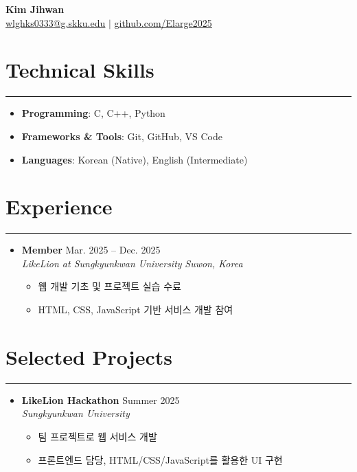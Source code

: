 \documentclass[letterpaper, 10pt]{article}
\begin{document}
\begin{center}
    \textbf{\LARGE Kim Jihwan} \\ \vspace{2pt}
    \href{mailto:wlghks0333@g.skku.edu}{\underline{wlghks0333@g.skku.edu}} $|$
    \href{https://github.com/Elarge2025}{\underline{github.com/Elarge2025}}
\end{center}

\section*{Technical Skills}
\hrule
\vspace{4pt}
\begin{itemize}
    \item[] \textbf{Programming}: C, C++, Python
    \item[] \textbf{Frameworks \& Tools}: Git, GitHub, VS Code
    \item[] \textbf{Languages}: Korean (Native), English (Intermediate)
\end{itemize}

\section*{Experience}
\hrule
\vspace{4pt}
\begin{itemize}
    \item[]
        \textbf{Member} \hfill Mar. 2025 -- Dec. 2025 \\
        \textit{LikeLion at Sungkyunkwan University} \hfill \textit{Suwon, Korea}
        \begin{itemize}
            \item 웹 개발 기초 및 프로젝트 실습 수료
            \item HTML, CSS, JavaScript 기반 서비스 개발 참여
        \end{itemize}
\end{itemize}

\section*{Selected Projects}
\hrule
\vspace{4pt}
\begin{itemize}
    \item[]
        \textbf{LikeLion Hackathon} \hfill Summer 2025 \\
        \textit{Sungkyunkwan University}
        \begin{itemize}
            \item 팀 프로젝트로 웹 서비스 개발
            \item 프론트엔드 담당, HTML/CSS/JavaScript를 활용한 UI 구현
        \end{itemize}
\end{itemize}
\end{document}
